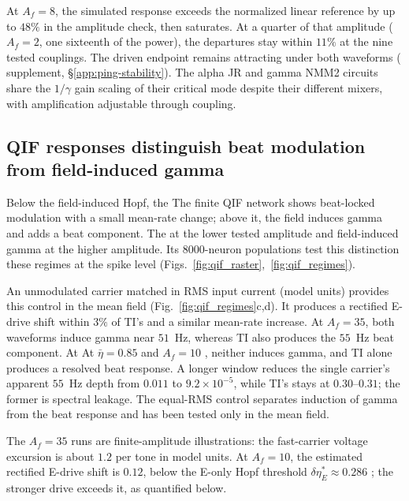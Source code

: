 \documentclass[11pt,a4paper]{article}
\providecommand{\DIFaddtex}[1]{{\protect\color{blue} \sf #1}} %
\providecommand{\DIFdeltex}[1]{{\protect\color{red} \scriptsize #1}} %
\providecommand{\DIFaddbegin}{} %
\providecommand{\DIFaddend}{} %
\providecommand{\DIFdelbegin}{} %
\providecommand{\DIFdelend}{} %
\providecommand{\DIFadd}[1]{\texorpdfstring{\DIFaddtex{#1}}{#1}} %
\providecommand{\DIFdel}[1]{\texorpdfstring{\DIFdeltex{#1}}{}} %
\begin{document}
At $A_f=8$, the simulated response exceeds the normalized linear reference by
up to $48\%$ in the amplitude check, then saturates. At a quarter of that
amplitude ($A_f=2$, one sixteenth of the power), the departures stay within
$11\%$ at the nine tested couplings. The driven endpoint remains attracting under both waveforms
(\DIFdelbegin \DIFdel{supplement, }\DIFdelend \S\ref{app:ping-stability}).
The alpha JR and gamma NMM2 circuits share the $1/\gamma$ gain scaling of their critical mode despite their different
mixers, with amplification adjustable through coupling.

\DIFaddbegin \fi

\DIFaddend \subsection{QIF responses distinguish beat modulation from field-induced gamma}\label{sec:qif}
\DIFdelbegin \DIFdel{Below the field-induced Hopf, the }\DIFdelend \DIFaddbegin \DIFadd{The finite }\DIFaddend QIF network shows beat-locked modulation \DIFdelbegin \DIFdel{with
a small mean-rate change; above it, the field induces gamma and adds a beat
component. The }\DIFdelend \DIFaddbegin \DIFadd{at the lower tested
amplitude and field-induced gamma at the higher amplitude. Its }\DIFaddend $8000$-neuron populations test
\DIFdelbegin \DIFdel{this distinction }\DIFdelend \DIFaddbegin \DIFadd{these regimes }\DIFaddend at the spike level
\cite{montbrio2015,ruffini2025rosetta,clusella2023}
(Figs.~\ref{fig:qif_raster},~\ref{fig:qif_regimes}).

\DIFdelbegin \DIFdel{An unmodulated carrier matched in RMS input current (model units)
provides this control in the mean field (Fig.~\ref{fig:qif_regimes}c,d). It produces a rectified E-drive
shift within $3\%$ of TI's and a similar mean-rate increase. At $A_f=35$, both
waveforms induce gamma near $51$~Hz, whereas TI also produces the $55$~Hz beat
component. At }\DIFdelend \DIFaddbegin \DIFadd{At $\bar\eta=0.85$ and }\DIFaddend $A_f=10$\DIFdelbegin \DIFdel{, neither induces gamma, and TI alone produces a resolved beat
response. A longer window reduces the single carrier's apparent $55$~Hz
depth from $0.011$ to $9.2\times10^{-5}$, while TI's stays at $0.30$--$0.31$;
the former is spectral leakage. The equal-RMS control separates induction
of gamma from the beat response and has been tested only in the mean field.
}%

\DIFdel{The $A_f=35$ runs are finite-amplitude illustrations: the fast-carrier voltage
excursion is about $1.2$ per tone in model units. At $A_f=10$}\DIFdelend , the estimated rectified E-drive shift
is $0.12$, below the E-only Hopf threshold $\delta\eta_E^*\approx0.286$\DIFdelbegin \DIFdel{; the stronger drive exceeds it, as quantified below.
}%
\end{document}
